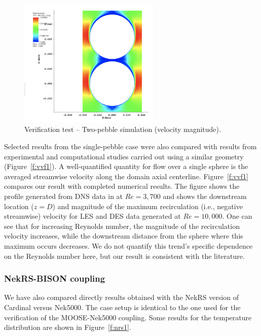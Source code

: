 \begin{figure}[!h]
\centering
\includegraphics[clip=true,width=0.6\textwidth]{Figures/pb_vv2}
\caption{Verification test -- Two-pebble simulation (velocity magnitude).}
\label{f:vvf2}
\end{figure}

Selected results from the single-pebble case were also compared with results from experimental and computational studies carried out using a similar geometry (Figure~\ref{f:vvf1}). A well-quantified quantity for flow over a single sphere is the averaged streamwise velocity along the domain axial centerline. Figure~\ref{f:vvf1} compares our result with completed numerical results. The figure shows the profile generated from DNS data in \cite{fick2017investigation} at $Re = 3,700$ and shows the downstream location ($z=D$) and magnitude of the maximum recirculation (i.e., negative streamwise) velocity for LES and DES data generated at $Re = 10,000$. One can see that for increasing Reynolds number, the magnitude of the recirculation velocity increases, while the downstream distance from the sphere where this maximum occurs decreases. We do not quantify this trend's specific dependence on the Reynolds number here, but our result is consistent with the literature.

\subsubsection{NekRS-BISON coupling}

We have also compared directly results obtained with the NekRS version of Cardinal versus Nek5000. The case setup is identical to the one used for the verification of the MOOSE-Nek5000 coupling. Some results for the temperature distribution are shown in Figure~\ref{f:nrs1}.

